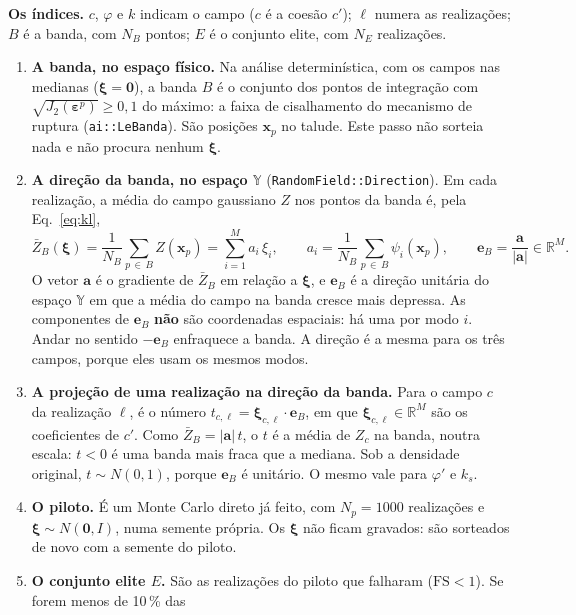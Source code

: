 \documentclass[11pt,a4paper]{article}
\newcommand{\Y}{\mathbb{Y}}
\newcommand{\xib}{\bm\xi}
\newcommand{\FS}{\mathrm{FS}}
\begin{document}
\textbf{Os índices.} $c$, $\varphi$ e $k$ indicam o campo ($c$ é a coesão $c'$); $\ell$ numera as realizações; $B$ é a
banda, com $N_B$ pontos; $E$ é o conjunto elite, com $N_E$ realizações.
\begin{enumerate}
  \item \textbf{A banda, no espaço físico.} Na análise determinística, com os campos nas medianas ($\xib = \bm 0$), a
    banda $B$ é o conjunto dos pontos de integração com $\sqrt{J_2(\bm\varepsilon^p)} \ge 0{,}1$ do máximo: a faixa de
    cisalhamento do mecanismo de ruptura (\texttt{ai::LeBanda}). São posições $\bm x_p$ no talude. Este passo não sorteia
    nada e não procura nenhum $\xib$.
  \item \textbf{A direção da banda, no espaço $\Y$} (\texttt{RandomField::Direction}). Em cada realização, a média do
    campo gaussiano $Z$ nos pontos da banda é, pela Eq.~\eqref{eq:kl},
    \begin{equation}
      \bar Z_B(\xib) = \frac{1}{N_B}\sum_{p\,\in\,B} Z(\bm x_p) = \sum_{i=1}^M a_i\,\xi_i, \qquad
      a_i = \frac{1}{N_B}\sum_{p\,\in\,B}\psi_i(\bm x_p), \qquad \bm e_B = \frac{\bm a}{|\bm a|} \in \mathbb R^M.
      \label{eq:eb}
    \end{equation}
    O vetor $\bm a$ é o gradiente de $\bar Z_B$ em relação a $\xib$, e $\bm e_B$ é a direção unitária do espaço $\Y$ em
    que a média do campo na banda cresce mais depressa. As componentes de $\bm e_B$ \textbf{não} são coordenadas
    espaciais: há uma por modo $i$. Andar no sentido $-\bm e_B$ enfraquece a banda. A direção é a mesma para os três
    campos, porque eles usam os mesmos modos.
  \item \textbf{A projeção de uma realização na direção da banda.} Para o campo $c$ da realização $\ell$, é o número
    $t_{c,\ell} = \xib_{c,\ell}\cdot\bm e_B$, em que $\xib_{c,\ell} \in \mathbb R^M$ são os coeficientes de $c'$. Como
    $\bar Z_B = |\bm a|\,t$, o $t$ é a média de $Z_c$ na banda, noutra escala: $t < 0$ é uma banda mais fraca que a
    mediana. Sob a densidade original, $t \sim N(0, 1)$, porque $\bm e_B$ é unitário. O mesmo vale para $\varphi'$ e $k_s$.
  \item \textbf{O piloto.} É um Monte Carlo direto já feito, com $N_p = 1000$ realizações e $\xib \sim N(\bm 0, I)$, numa
    semente própria. Os $\xib$ não ficam gravados: são sorteados de novo com a semente do piloto.
  \item \textbf{O conjunto elite $E$.} São as realizações do piloto que falharam ($\FS < 1$). Se forem menos de 10\,\% das

\end{enumerate}
\end{document}

